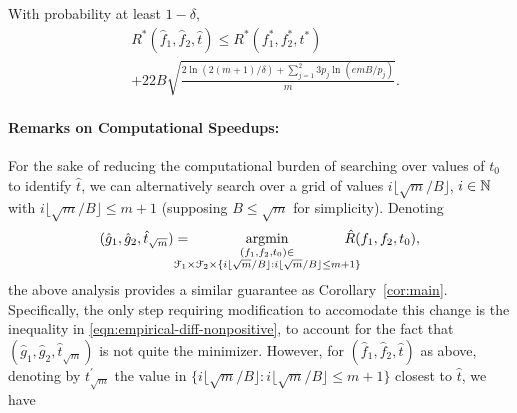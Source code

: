 \documentclass{article}
\begin{document}
\begin{corollary}
\label{cor:main}
With probability at least $1-\delta$, 
\begin{align*}
& R^{*}(\hat{f}_{1},\hat{f}_{2},\hat{t})
\leq R^{*}(f_{1}^{*},f_{2}^{*},t^{*})
\\ & + 22 B \sqrt{\frac{2 \ln(2 (m+1) /\delta) + \sum_{j=1}^{2} 3 p_{j} \ln( e m B / p_{j} )}{m}}. 
\end{align*}
\end{corollary}

\paragraph{Remarks on Computational Speedups:}
For the sake of reducing the computational burden of searching over values of $t_{0}$
to identify $\hat{t}$, we can alternatively search over a grid of values $i \lfloor \sqrt{m}/B \rfloor$, $i \in \mathbb{N}$ with $i \lfloor \sqrt{m}/B \rfloor \leq m+1$
(supposing $B \leq \sqrt{m}$ for simplicity).
Denoting
\begin{equation*}
(\hat{g}_{1},\hat{g}_{2},\hat{t}_{\sqrt{m}}) = 
\!\!\!\!\!\!\!\!\argmin_{\substack{(f_{1},f_{2},t_{0}) \in \\ \F_{1} \times \F_{2} \times \{ i \lfloor \sqrt{m}/B \rfloor : i \lfloor \sqrt{m}/B \rfloor \leq m+1\}}}
\!\!\!\!\!\!\!\!\hat{R}(f_{1},f_{2},t_{0}),
\end{equation*}
the above analysis provides a similar guarantee as Corollary~\ref{cor:main}.
Specifically, the only step requiring modification to accomodate this change is the inequality in \eqref{eqn:empirical-diff-nonpositive},
to account for the fact that $(\hat{g}_{1},\hat{g}_{2},\hat{t}_{\sqrt{m}})$ is not quite the minimizer.
However, for $(\hat{f}_{1},\hat{f}_{2},\hat{t})$ as above, 
denoting by $t_{\sqrt{m}}^{\prime}$ the value in $\{ i \lfloor \sqrt{m}/B \rfloor : i \lfloor \sqrt{m}/B \rfloor \leq m+1 \}$
closest to $\hat{t}$, we have
\end{document}
